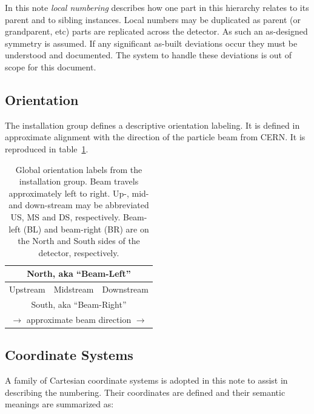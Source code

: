 \documentclass[pdftex,12pt,letter]{article}
\begin{document}
In this note \textit{local
  numbering} describes how one part in this hierarchy relates to its
parent and to sibling instances.  Local numbers may be duplicated as
parent (or grandparent, etc) parts are replicated across the detector.
As such an as-designed symmetry is assumed.  If any significant
as-built deviations occur they must be understood and documented.  The
system to handle these deviations is out of scope for this document.  

\subsection{Orientation}

The installation group defines a descriptive orientation labeling.  It
is defined in approximate alignment with the direction of the particle
beam from CERN.  It is reproduced in table~\ref{tab:global}.

\begin{table}[htp]
  \label{tab:global}
  \centering
  \begin{tabular}[h]{|c|c|c|}
    \hline
    \multicolumn{3}{|c|}{North, aka ``Beam-Left''} \\
    \hline
    Upstream & Midstream & Downstream \\
    \hline
    \multicolumn{3}{|c|}{South, aka ``Beam-Right''} \\
    \hline
    \multicolumn{3}{c}{$\longrightarrow$ approximate beam direction $\longrightarrow$} \\    
  \end{tabular}
  \caption{Global orientation labels from the installation group.
    Beam travels approximately left to right.  Up-, mid- and
    down-stream may be abbreviated US, MS and DS, respectively.
    Beam-left (BL) and beam-right (BR) are on the North and South
    sides of the detector, respectively.}
\end{table}

\subsection{Coordinate Systems}
\label{sec:coordsys}

A family of Cartesian coordinate systems is adopted in this note to
assist in describing the numbering.  Their coordinates are defined and
their semantic meanings are summarized as:
\end{document}
